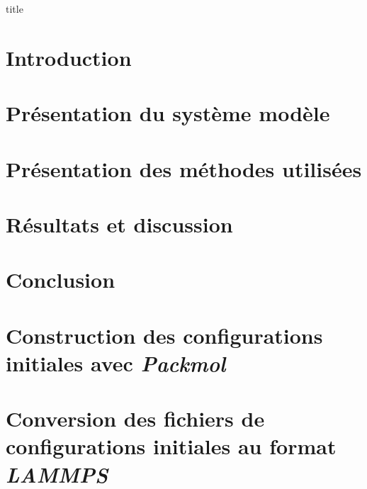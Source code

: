 \documentclass[a4paper, 11pt]{article}
\begin{document}
    {title}
\clearpage


\tableofcontents
\thispagestyle{empty}
\clearpage


\setcounter{page}{1}
\section*{Introduction}

    
\clearpage


\section{Présentation du système modèle}

    
\clearpage

\section{Présentation des méthodes utilisées}


\clearpage


\section{Résultats et discussion}


\clearpage


\section{Conclusion}


\clearpage


\appendix
\section{Construction des configurations initiales avec \emph{Packmol}} \label{apdx:packmol}

    
\clearpage

\section{Conversion des fichiers de configurations initiales au format \emph{LAMMPS}} \label{apdx:conversion_lammps}

    
\clearpage


\printbibliography
\end{document}
